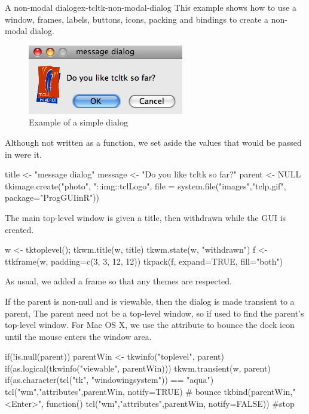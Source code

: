 \begin{example}{A non-modal dialog}{ex-tcltk-non-modal-dialog}
This example shows how to use  a window, frames,  labels, buttons,
icons, packing and bindings to create a non-modal dialog. 

\begin{figure}
  \centering
  \includegraphics[width=.4\textwidth]{fig-tcltk-simple-dialog.png}
  \caption{Example of a simple dialog}
  \label{fig:fig-tcltk-simple-dialog}
\end{figure}

Although not written as a function, we set aside the values that would
be passed in were it.
\begin{Schunk}
\begin{Sinput}
 title <- "message dialog"
 message <- "Do you like tcltk so far?"
 parent <- NULL
 tkimage.create("photo", "::img::tclLogo", 
                file = system.file("images","tclp.gif",
                  package="ProgGUIinR"))
\end{Sinput}
\end{Schunk}

The main top-level window is given a title, then withdrawn while
the GUI is created. 
\begin{Schunk}
\begin{Sinput}
 w <- tktoplevel(); tkwm.title(w, title)
 tkwm.state(w, "withdrawn")
 f <- ttkframe(w,  padding=c(3, 3, 12, 12))
 tkpack(f, expand=TRUE, fill="both")
\end{Sinput}
\end{Schunk}
As usual, we added a frame so that any themes are respected.

If the parent is non-null and is viewable, then the dialog is made
transient to a parent, The parent need not be a top-level window, so
 if used to find the parent's top-level window. For
Mac OS X, we use the  attribute to bounce the dock icon
until the mouse enters the window area.

\begin{Schunk}
\begin{Sinput}
 if(!is.null(parent)) {
   parentWin <- tkwinfo("toplevel", parent)
   if(as.logical(tkwinfo("viewable", parentWin))) {
     tkwm.transient(w, parent)
     if(as.character(tcl("tk", "windowingsystem")) == "aqua") {
       tcl("wm","attributes",parentWin, notify=TRUE) # bounce
       tkbind(parentWin,"<Enter>", function() 
              tcl("wm","attributes",parentWin, notify=FALSE)) #stop
     }
   }
 }
\end{Sinput}
\end{Schunk}


\end{example}
